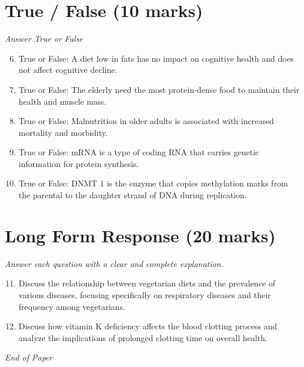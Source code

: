 \documentclass[12pt]{article}
\begin{document}
\section*{True / False (10 marks)}
\textit{Answer True or False}
\begin{enumerate}[label=\arabic*.]
\setcounter{enumi}{5}
\item True or False: A diet low in fats has no impact on cognitive health and does not affect cognitive decline.
\item True or False: The elderly need the most protein-dense food to maintain their health and muscle mass.
\item True or False: Malnutrition in older adults is associated with increased mortality and morbidity.
\item True or False: mRNA is a type of coding RNA that carries genetic information for protein synthesis.
\item True or False: DNMT 1 is the enzyme that copies methylation marks from the parental to the daughter strand of DNA during replication.
\end{enumerate}

\section*{Long Form Response (20 marks)}
\textit{Answer each question with a clear and complete explanation.}
\begin{enumerate}[label=\arabic*.]
\setcounter{enumi}{10}
\item Discuss the relationship between vegetarian diets and the prevalence of various diseases, focusing specifically on respiratory diseases and their frequency among vegetarians.
\item Discuss how vitamin K deficiency affects the blood clotting process and analyze the implications of prolonged clotting time on overall health.
\end{enumerate}

\vfill
\noindent\textit{End of Paper}
\end{document}
